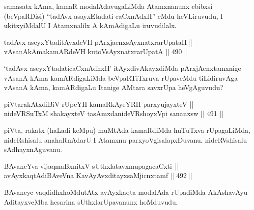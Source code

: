 \begin{artha}
samasatx kAma, kamaR modalAdavugaLiMda Atamxnanunx ebibxsi (beVpaRDisi)
``tadAvx asayxEtadati caCxnAdxH'' eMdu heVLiruvudu, I ukitxyiMdalU I
Atamxnalilx A kAmAdigaLu iruvudilalx.
\end{artha}


\begin{shl}
tadAvx aseyxYtaditAyxdeVH pArxjacnxsAyx\s \s natxrarUpataH || \\
vAsanAkAmakamARdeVH kutoV\s sAyx\s \s natxrarUpatA \hfill || 490 ||  
\end{shl}

\begin{artha}
`tadAvx aseyxYtadaticaCxnAdhxH' itAyxdivAkayxdiMda pArxjAcnxtamxnige
vAsanA kAma kamARdigaLiMda beVpaRTiTxruva rUpaveMdu tiLidiruvAga
vAsanA kAma, kamARdigaLu Itanige AMtara savxrUpa heVgAguvudu?
\end{artha}


\begin{shl}
piVtarakAtxdiBiV rUpeYH kamaRkAyeYRH parxyujayxteV || \\
nideVRSuTxM shakayxteV tasAmxdanideVRshoyxV\s pi sananxsw \hfill || 491 ||  
\end{shl}

\begin{artha}
piVta, rakatx (haLadi keMpu) muMtAda kamaRdiMda huTuTxva rUpagaLiMda,
nideRshisalu anahaRnAdarU I Atamxnu parxyoVgisalapxDuvanu.
nideRVshisalu sAdhayxnAguvanu.
\end{artha}

\begin{shl}
BAvaneYva vijaqmaBxnitxV sUthxlatavxmupagacaCxti || \\
avAyxkaqtAdiBAveVna KavAyAvxditayxsaMjicnxtamf \hfill || 492 ||  
\end{shl}

\begin{artha}
BAvaneye vaqdidhxhoMdutAtx avAyxkaqta modalAda rUpadiMda AkAshavAyu
AditayxveMba hesarina sUthxlarUpavanunx hoMduvudu.
\end{artha}


